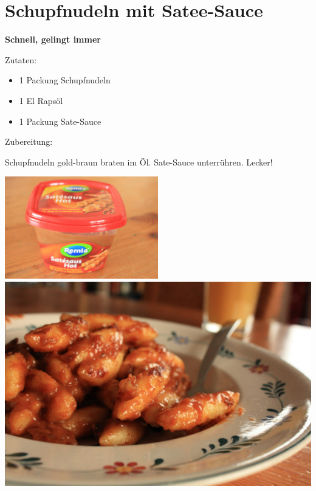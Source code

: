 \section{Schupfnudeln mit Satee-Sauce}

\textbf{Schnell, gelingt immer}

Zutaten:
\begin{itemize}
    \item 1 Packung Schupfnudeln
    \item 1 El Rapsöl
    \item 1 Packung Sate-Sauce
\end{itemize}

\noindent Zubereitung:

\noindent Schupfnudeln gold-braun braten im Öl. Sate-Sauce unterrühren. Lecker!

\newpage
\mbox{}
\vfill
\begin{center}
    \includegraphics[width=0.5\textwidth]{Schupfnudeln-Satee/IMG_6114_small.jpg}
    \vfill
    \includegraphics[width=\textwidth]{Schupfnudeln-Satee/IMG_6108_small.jpg}
\end{center}
\vfill
\mbox{ }
\newpage
